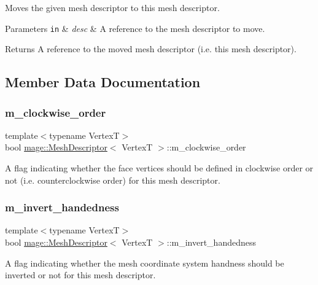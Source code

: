 Moves the given mesh descriptor to this mesh descriptor.


\begin{DoxyParams}[1]{Parameters}
\mbox{\tt in}  & {\em desc} & A reference to the mesh descriptor to move. \\
\hline
\end{DoxyParams}
\begin{DoxyReturn}{Returns}
A reference to the moved mesh descriptor (i.\+e. this mesh descriptor). 
\end{DoxyReturn}


\subsection{Member Data Documentation}
\hypertarget{structmage_1_1_mesh_descriptor_a7e769c8d1d81b3514b951b306865dc88}{}\label{structmage_1_1_mesh_descriptor_a7e769c8d1d81b3514b951b306865dc88} 
\subsubsection{\texorpdfstring{m\+\_\+clockwise\+\_\+order}{m\_clockwise\_order}}
{\footnotesize\ttfamily template$<$typename VertexT$>$ \\
bool \hyperlink{structmage_1_1_mesh_descriptor}{mage\+::\+Mesh\+Descriptor}$<$ VertexT $>$\+::m\+\_\+clockwise\+\_\+order\hspace{0.3cm}{\ttfamily [private]}}

A flag indicating whether the face vertices should be defined in clockwise order or not (i.\+e. counterclockwise order) for this mesh descriptor. \hypertarget{structmage_1_1_mesh_descriptor_af7b8124e44ac65ca2088d5d8ca0639f5}{}\label{structmage_1_1_mesh_descriptor_af7b8124e44ac65ca2088d5d8ca0639f5} 
\subsubsection{\texorpdfstring{m\+\_\+invert\+\_\+handedness}{m\_invert\_handedness}}
{\footnotesize\ttfamily template$<$typename VertexT$>$ \\
bool \hyperlink{structmage_1_1_mesh_descriptor}{mage\+::\+Mesh\+Descriptor}$<$ VertexT $>$\+::m\+\_\+invert\+\_\+handedness\hspace{0.3cm}{\ttfamily [private]}}

A flag indicating whether the mesh coordinate system handness should be inverted or not for this mesh descriptor. 